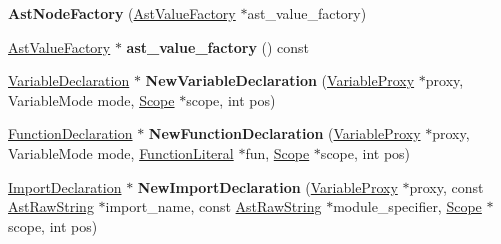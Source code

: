 \begin{DoxyCompactItemize}
\item 
{\bfseries Ast\+Node\+Factory} (\hyperlink{classv8_1_1internal_1_1_ast_value_factory}{Ast\+Value\+Factory} $\ast$ast\+\_\+value\+\_\+factory)\hypertarget{classv8_1_1internal_1_1_b_a_s_e___e_m_b_e_d_d_e_d_a5edb9f8569a0bd135bc98122351d1dc0}{}\label{classv8_1_1internal_1_1_b_a_s_e___e_m_b_e_d_d_e_d_a5edb9f8569a0bd135bc98122351d1dc0}

\item 
\hyperlink{classv8_1_1internal_1_1_ast_value_factory}{Ast\+Value\+Factory} $\ast$ {\bfseries ast\+\_\+value\+\_\+factory} () const \hypertarget{classv8_1_1internal_1_1_b_a_s_e___e_m_b_e_d_d_e_d_aedda84ecd07a5b737e480f2ac4fa10eb}{}\label{classv8_1_1internal_1_1_b_a_s_e___e_m_b_e_d_d_e_d_aedda84ecd07a5b737e480f2ac4fa10eb}

\item 
\hyperlink{classv8_1_1internal_1_1_variable_declaration}{Variable\+Declaration} $\ast$ {\bfseries New\+Variable\+Declaration} (\hyperlink{classv8_1_1internal_1_1_variable_proxy}{Variable\+Proxy} $\ast$proxy, Variable\+Mode mode, \hyperlink{classv8_1_1internal_1_1_scope}{Scope} $\ast$scope, int pos)\hypertarget{classv8_1_1internal_1_1_b_a_s_e___e_m_b_e_d_d_e_d_a69569273c7361c4d030ff22185a0e4e4}{}\label{classv8_1_1internal_1_1_b_a_s_e___e_m_b_e_d_d_e_d_a69569273c7361c4d030ff22185a0e4e4}

\item 
\hyperlink{classv8_1_1internal_1_1_function_declaration}{Function\+Declaration} $\ast$ {\bfseries New\+Function\+Declaration} (\hyperlink{classv8_1_1internal_1_1_variable_proxy}{Variable\+Proxy} $\ast$proxy, Variable\+Mode mode, \hyperlink{classv8_1_1internal_1_1_function_literal}{Function\+Literal} $\ast$fun, \hyperlink{classv8_1_1internal_1_1_scope}{Scope} $\ast$scope, int pos)\hypertarget{classv8_1_1internal_1_1_b_a_s_e___e_m_b_e_d_d_e_d_aedc57d4c16df3ca839cad536b700265c}{}\label{classv8_1_1internal_1_1_b_a_s_e___e_m_b_e_d_d_e_d_aedc57d4c16df3ca839cad536b700265c}

\item 
\hyperlink{classv8_1_1internal_1_1_import_declaration}{Import\+Declaration} $\ast$ {\bfseries New\+Import\+Declaration} (\hyperlink{classv8_1_1internal_1_1_variable_proxy}{Variable\+Proxy} $\ast$proxy, const \hyperlink{classv8_1_1internal_1_1_ast_raw_string}{Ast\+Raw\+String} $\ast$import\+\_\+name, const \hyperlink{classv8_1_1internal_1_1_ast_raw_string}{Ast\+Raw\+String} $\ast$module\+\_\+specifier, \hyperlink{classv8_1_1internal_1_1_scope}{Scope} $\ast$scope, int pos)\hypertarget{classv8_1_1internal_1_1_b_a_s_e___e_m_b_e_d_d_e_d_a22607593df545ab670dc163ee92a148e}{}\label{classv8_1_1internal_1_1_b_a_s_e___e_m_b_e_d_d_e_d_a22607593df545ab670dc163ee92a148e}


\end{DoxyCompactItemize}
